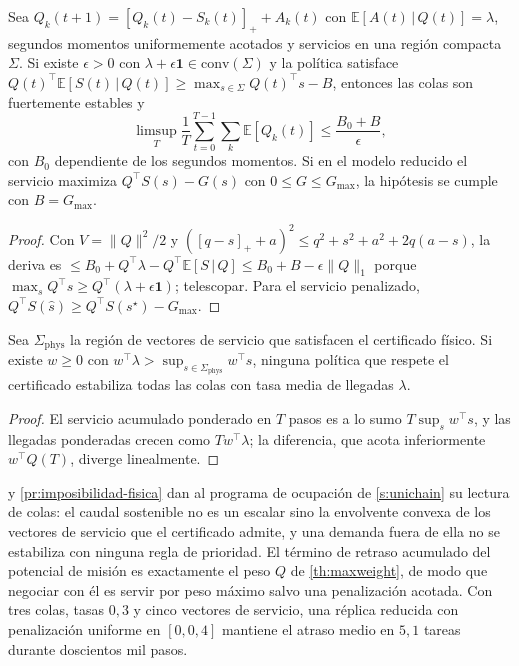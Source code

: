\begin{teorema}
\label{th:maxweight}
Sea $Q_k(t+1)=[Q_k(t)-S_k(t)]_++A_k(t)$ con
$\mathbb E[A(t)\,|\,Q(t)]=\lambda$, segundos momentos uniformemente acotados
y servicios en una región compacta $\Sigma$. Si existe $\epsilon>0$ con
$\lambda+\epsilon\mathbf 1\in\mathrm{conv}(\Sigma)$ y la política satisface
$Q(t)^{\!\top}\mathbb E[S(t)\,|\,Q(t)]\ge\max_{s\in\Sigma}Q(t)^{\!\top}s-B$,
entonces las colas son fuertemente estables y
\begin{equation}
  \label{eq:maxweight}
  \limsup_{T}\frac1T\sum_{t=0}^{T-1}\sum_k\mathbb E[Q_k(t)]\le\frac{B_0+B}{\epsilon},
\end{equation}
con $B_0$ dependiente de los segundos momentos. Si en el modelo reducido el
servicio maximiza $Q^{\!\top}S(s)-G(s)$ con $0\le G\le G_{\max}$, la hipótesis
se cumple con $B=G_{\max}$.
\end{teorema}

\begin{proof}
Con $V=\lVert Q\rVert^2/2$ y $([q-s]_++a)^2\le q^2+s^2+a^2+2q(a-s)$, la
deriva es $\le B_0+Q^{\!\top}\lambda-Q^{\!\top}\mathbb E[S\,|\,Q]\le B_0+B-\epsilon\lVert Q\rVert_1$
porque $\max_sQ^{\!\top}s\ge Q^{\!\top}(\lambda+\epsilon\mathbf 1)$;
telescopar. Para el servicio penalizado,
$Q^{\!\top}S(\hat s)\ge Q^{\!\top}S(s^\star)-G_{\max}$.
\end{proof}

\begin{proposicion}
\label{pr:imposibilidad-fisica}
Sea $\Sigma_{\mathrm{phys}}$ la región de vectores de servicio que satisfacen
el certificado físico. Si existe $w\ge0$ con
$w^{\!\top}\lambda>\sup_{s\in\Sigma_{\mathrm{phys}}}w^{\!\top}s$, ninguna
política que respete el certificado estabiliza todas las colas con tasa
media de llegadas $\lambda$.
\end{proposicion}

\begin{proof}
El servicio acumulado ponderado en $T$ pasos es a lo sumo
$T\sup_sw^{\!\top}s$, y las llegadas ponderadas crecen como
$Tw^{\!\top}\lambda$; la diferencia, que acota inferiormente
$w^{\!\top}Q(T)$, diverge linealmente.
\end{proof}

\begin{observacion}
\label{obs:region-caudal}
 y \cref{pr:imposibilidad-fisica} dan al programa de
ocupación de \cref{s:unichain} su lectura de colas: el caudal sostenible no
es un escalar sino la envolvente convexa de los vectores de servicio que el
certificado admite, y una demanda fuera de ella no se estabiliza con ninguna
regla de prioridad. El término de retraso acumulado del potencial de misión
es exactamente el peso $Q$ de \cref{th:maxweight}, de modo que negociar con
él es servir por peso máximo salvo una penalización acotada. Con tres colas,
tasas $0{,}3$ y cinco vectores de servicio, una réplica reducida con
penalización uniforme en $[0,0{,}4]$ mantiene el atraso medio en $5{,}1$
tareas durante doscientos mil pasos.
\end{observacion}
